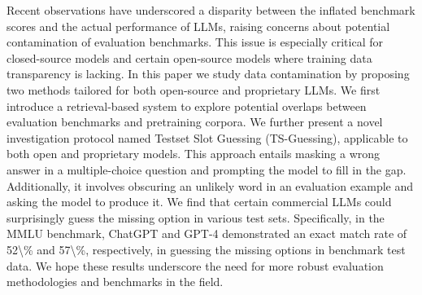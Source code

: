 Recent observations have underscored a disparity between the inflated benchmark scores and the actual performance of LLMs, raising concerns about potential contamination of evaluation benchmarks. This issue is especially critical for closed-source models and certain open-source models where training data transparency is lacking. In this paper we study data contamination by proposing two methods tailored for both open-source and proprietary LLMs. We first introduce a retrieval-based system to explore potential overlaps between evaluation benchmarks and pretraining corpora. We further present a novel investigation protocol named Testset Slot Guessing (TS-Guessing), applicable to both open and proprietary models. This approach entails masking a wrong answer in a multiple-choice question and prompting the model to fill in the gap. Additionally, it involves obscuring an unlikely word in an evaluation example and asking the model to produce it. We find that certain commercial LLMs could surprisingly guess the missing option in various test sets. Specifically, in the MMLU benchmark, ChatGPT and GPT-4 demonstrated an exact match rate of 52\textbackslash{}\% and 57\textbackslash{}\%, respectively, in guessing the missing options in benchmark test data. We hope these results underscore the need for more robust evaluation methodologies and benchmarks in the field.